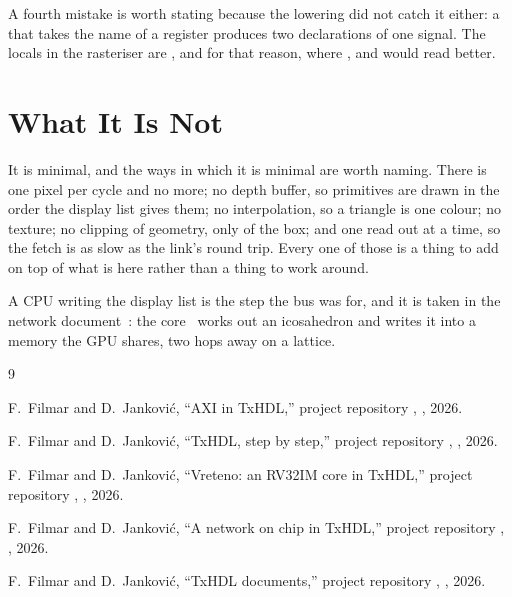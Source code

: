 \documentclass[journal,9pt]{IEEEtran}
\begin{document}
A fourth mistake is worth stating because the lowering did not catch
it either: a  that takes the name of a register produces
two declarations of one signal. The locals in the rasteriser are
,  and  for that reason, where ,
 and  would read better.

\section{What It Is Not}
\label{sec:g-not}

It is minimal, and the ways in which it is minimal are worth naming.
There is one pixel per cycle and no more; no depth buffer, so
primitives are drawn in the order the display list gives them; no
interpolation, so a triangle is one colour; no texture; no clipping
of geometry, only of the box; and one read out at a time, so the
fetch is as slow as the link's round trip. Every one of those is a
thing to add on top of what is here rather than a thing to work
around.

A CPU writing the display list is the step the bus was for, and it is
taken in the network document~\cite{noc}: the core~\cite{vreteno}
works out an icosahedron and writes it into a memory the GPU shares,
two hops away on a lattice.

\begin{thebibliography}{9}

F.~Filmar and D.~Janković, ``AXI in TxHDL,'' project repository
, , 2026.

F.~Filmar and D.~Janković, ``TxHDL, step by step,'' project
repository , , 2026.

F.~Filmar and D.~Janković, ``Vreteno: an RV32IM core in TxHDL,''
project repository , , 2026.

F.~Filmar and D.~Janković, ``A network on chip in TxHDL,'' project
repository , , 2026.

F.~Filmar and D.~Janković, ``TxHDL documents,'' project repository
, , 2026.

\end{thebibliography}
\end{document}
